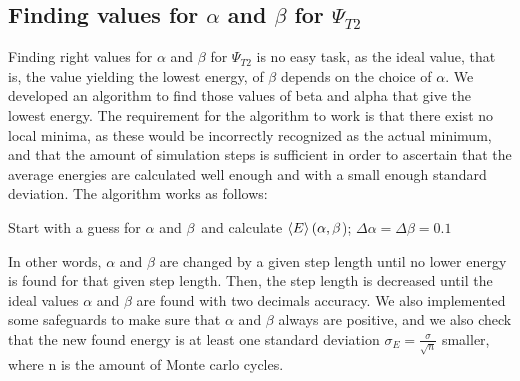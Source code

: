 \documentclass[10pt,a4paper]{article}
\begin{document}
\subsection{Finding values for $\alpha$ and $\beta$ for $\Psi_{T2}$}
Finding right values for $\alpha$ and $\beta$ for $\Psi_{T2}$ is no easy task, as the ideal value, that is, the value yielding the lowest energy, of $\beta$ depends on the choice of $\alpha$. We developed an algorithm to find those values of beta and alpha that give the lowest energy. The requirement for the algorithm to work is that there exist no local minima, as these would be incorrectly recognized as the actual minimum, and that the amount of simulation steps is sufficient in order to ascertain that the average energies are calculated well enough and with a small enough standard deviation. 
The algorithm works as follows:\\
\IncMargin{1em}
\begin{algorithm}[H]  
    Start with a guess for $\alpha$ and $\beta$\ and calculate $\braket{E}(\alpha,\beta$);
    $\Delta\alpha=\Delta\beta=0.1$\;
\end{algorithm}
\DecMargin{1em}
In other words, $\alpha$ and $\beta$ are changed by a given step length until no lower energy is found  for that given step length. Then, the step length is decreased until the ideal values $\alpha$ and $\beta$ are found with two decimals accuracy. We also implemented some safeguards to make sure that $\alpha$ and $\beta$ always are positive, and we also check that the new found energy is at least one standard deviation $\sigma_E=\frac{\sigma}{\sqrt{n}}$ smaller, where n is the amount of Monte carlo cycles. 
\end{document}
